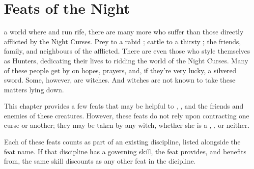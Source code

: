 \chapter{Feats of the Night}

 a world where {\werewolves} and {\vampires} run rife, there are many more who suffer than those directly afflicted by the Night Curses.
Prey to a rabid {\werewolf}; cattle to a thirsty {\vampire}; the friends, family, and neighbours of the afflicted.
There are even those who style themselves as Hunters, dedicating their lives to ridding the world of the Night Curses.
Many of these people get by on hopes, prayers, and, if they're very lucky, a silvered sword.
Some, however, are witches.
And witches are not known to take these matters lying down.

This chapter provides a few feats that may be helpful to {\werewolves}, {\vampires}, and the friends and enemies of these creatures.
However, these feats do not rely upon contracting one curse or another; they may be taken by any witch, whether she is a {\werewolf}, {\vampire}, or neither.

Each of these feats counts as part of an existing discipline, listed alongside the feat name.
If that discipline has a governing skill, the feat provides, and benefits from, the same skill discounts as any other feat in the dicipline.
